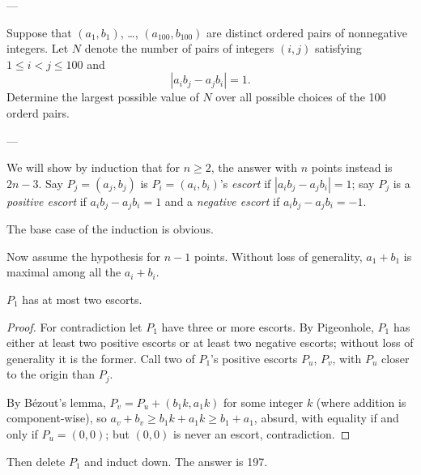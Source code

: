 
---

Suppose that $(a_1,b_1)$, \ldots, $(a_{100},b_{100})$ are distinct ordered pairs of nonnegative integers. Let $N$ denote the number of pairs of integers $(i,j)$ satisfying $1\le i<j\le100$ and
\[|a_ib_j-a_jb_i|=1.\]
Determine the largest possible value of $N$ over all possible choices of the 100 orderd pairs.

---

We will show by induction that for $n\ge2$, the answer with $n$ points instead is $2n-3$. Say $P_j=(a_j,b_j)$ is $P_i=(a_i,b_i)$'s \emph{escort} if $|a_ib_j-a_jb_i|=1$; say $P_j$ is a \emph{positive escort} if $a_ib_j-a_jb_i=1$ and a \emph{negative escort} if $a_ib_j-a_jb_i=-1$.

The base case of the induction is obvious.

Now assume the hypothesis for $n-1$ points. Without loss of generality, $a_1+b_1$ is maximal among all the $a_i+b_i$.
\begin{claim*}
    $P_1$ has at most two escorts.
\end{claim*}
\begin{proof}
    For contradiction let $P_1$ have three or more escorts. By Pigeonhole, $P_1$ has either at least two positive escorts or at least two negative escorts; without loss of generality it is the former. Call two of $P_1$'s positive escorts $P_u$, $P_v$, with $P_u$ closer to the origin than $P_j$.

    By B\'ezout's lemma, $P_v=P_u+(b_1k,a_1k)$ for some integer $k$ (where addition is component-wise), so $a_v+b_v\ge b_1k+a_1k\ge b_1+a_1$, absurd, with equality if and only if $P_u=(0,0)$; but $(0,0)$ is never an escort, contradiction.
\end{proof}

Then delete $P_1$ and induct down. The answer is 197.


